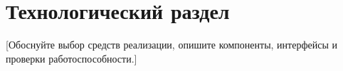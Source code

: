 \section{Технологический раздел}

[Обоснуйте выбор средств реализации, опишите компоненты, интерфейсы
и проверки работоспособности.]
